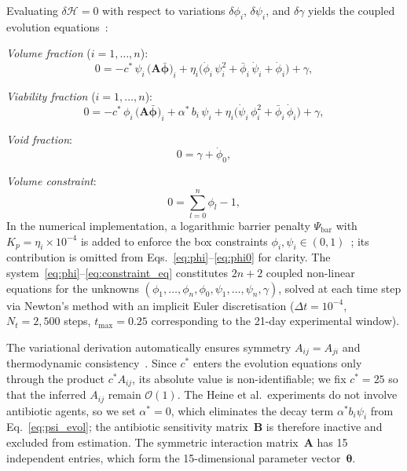 \documentclass[11pt,a4paper]{article}
\newcommand{\btheta}{\boldsymbol{\theta}}
\newcommand{\bphi}{\boldsymbol{\phi}}
\begin{document}
Evaluating $\delta\mathcal{H}=0$ with respect to variations $\delta\phi_i$, $\delta\psi_i$, and $\delta\gamma$ yields the coupled evolution equations~\cite{Klempt2025ContinuumBiofilm}:

\medskip\noindent
\textit{Volume fraction} ($i=1,\dots,n$):
\begin{equation}
0 = -c^*\,\psi_i\,\bigl(\mathbf{A}\bar{\bphi}\bigr)_i
    + \eta_i\bigl(\dot\phi_i\,\psi_i^2 + \bar\phi_i\,\dot\psi_i + \dot\phi_i\bigr)
    + \gamma,
\label{eq:phi}
\end{equation}

\noindent\textit{Viability fraction} ($i=1,\dots,n$):
\begin{equation}
0 = -c^*\,\phi_i\,\bigl(\mathbf{A}\bar{\bphi}\bigr)_i
    + \alpha^*\,b_i\,\psi_i
    + \eta_i\bigl(\dot\psi_i\,\phi_i^2 + \bar\phi_i\,\dot\phi_i\bigr)
    + \gamma,
\label{eq:psi_evol}
\end{equation}

\noindent\textit{Void fraction}:
\begin{equation}
0 = \gamma + \dot\phi_0,
\label{eq:phi0}
\end{equation}

\noindent\textit{Volume constraint}:
\begin{equation}
0 = \sum_{l=0}^{n}\phi_l - 1,
\label{eq:constraint_eq}
\end{equation}
In the numerical implementation, a logarithmic barrier penalty $\Psi_{\mathrm{bar}}$ with $K_p=\eta_i\times10^{-4}$ is added to enforce the box constraints $\phi_i,\psi_i\in(0,1)$~\cite{Klempt2025ContinuumBiofilm}; its contribution is omitted from Eqs.~\eqref{eq:phi}--\eqref{eq:phi0} for clarity.
The system~\eqref{eq:phi}--\eqref{eq:constraint_eq} constitutes $2n+2$ coupled non-linear equations for the unknowns $(\phi_1,\dots,\phi_n,\phi_0,\psi_1,\dots,\psi_n,\gamma)$, solved at each time step via Newton's method with an implicit Euler discretisation ($\Delta t = 10^{-4}$, $N_t=2{,}500$ steps, $t_{\max}=0.25$ corresponding to the 21-day experimental window).

The variational derivation automatically ensures symmetry $A_{ij}=A_{ji}$ and thermodynamic consistency~\cite{JunkerBalzani2021ExtendedHamilton}.
Since $c^*$ enters the evolution equations only through the product $c^*A_{ij}$, its absolute value is non-identifiable; we fix $c^*=25$ so that the inferred $A_{ij}$ remain $\mathcal{O}(1)$.
The Heine et al.\ experiments do not involve antibiotic agents, so we set $\alpha^*=0$, which eliminates the decay term $\alpha^*b_i\psi_i$ from Eq.~\eqref{eq:psi_evol}; the antibiotic sensitivity matrix~$\mathbf{B}$ is therefore inactive and excluded from estimation.
The symmetric interaction matrix~$\mathbf{A}$ has 15 independent entries, which form the 15-dimensional parameter vector~$\btheta$.
\end{document}
